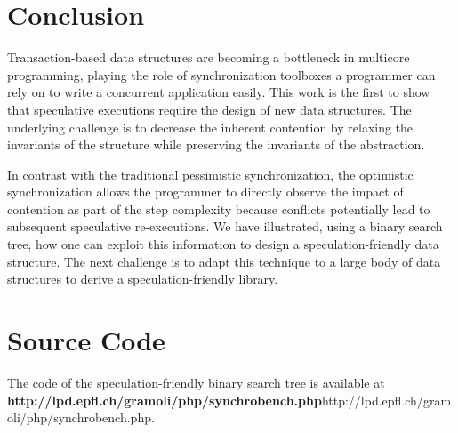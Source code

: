 \section{Conclusion}\label{sec:conclusion}

Transaction-based data structures are becoming a bottleneck in multicore programming,
playing the role of synchronization toolboxes a programmer can rely on to write 
a concurrent application easily.
This work is the first to show that speculative executions require the design of new data structures.
The underlying challenge is to decrease the inherent contention by relaxing the invariants of the structure
while preserving the invariants of the abstraction.

In contrast with the traditional pessimistic synchronization, the optimistic synchronization allows the programmer
to directly observe the impact of contention as part of the step complexity because conflicts potentially lead to subsequent speculative re-executions.
We have illustrated, using a binary search tree, how one can exploit this information
to design a speculation-friendly data structure.
The next challenge is to
adapt this technique to a large body of data structures to derive a speculation-friendly library.

\section*{Source Code}
The code of the speculation-friendly binary search tree is available at {\bf http://lpd.epfl.ch/gramoli/php/synchrobench.php}{http://lpd.epfl.ch/gramoli/php/synchrobench.php}.

% 
% 
% 
% 
% 

